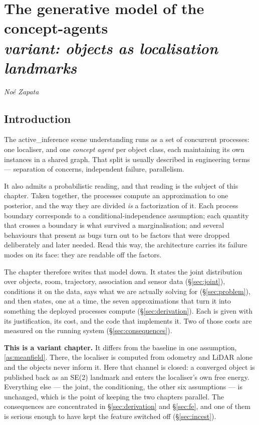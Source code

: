 \documentclass[11pt,a4paper]{report}
\theoremstyle{definition}   %
\begin{document}
\setcounter{chapter}{1}
\chapter{The generative model of the concept-agents\\[4pt]
         \large\normalfont\itshape variant: objects as localisation landmarks}

\begin{flushleft}
\textit{No\'e Zapata}
\end{flushleft}

\vspace{4pt}

\section{Introduction}
\label{sec:intro}



The \textsf{active\_inference} scene understanding runs as a set of concurrent processes: one
localiser, and one \emph{concept agent} per object class, each maintaining its own instances in a
shared graph. That split is usually described in engineering terms --- separation of
concerns, independent failure, parallelism.

It also admits a probabilistic reading, and that reading is the subject of this chapter. Taken
together, the processes compute an approximation to one posterior, and the way they are divided
\emph{is} a factorization of it. Each process boundary corresponds to a conditional-independence
assumption; each quantity that crosses a boundary is what survived a marginalisation; and several
behaviours that present as bugs turn out to be factors that were dropped deliberately and later
needed. Read this way, the architecture carries its failure modes on its face: they are readable
off the factors.

The chapter therefore writes that model down. It states the joint distribution over objects, room,
trajectory, association and sensor data (\S\ref{sec:joint}), conditions it on the data, says what
we are actually solving for (\S\ref{sec:problem}), and then states, one at a time, the seven
approximations that turn it into something the deployed processes compute
(\S\ref{sec:derivation}). Each is given with its justification, its cost, and the code that
implements it. Two of those costs are measured on the running system (\S\ref{sec:consequences}).

\medskip\noindent
\textbf{This is a variant chapter.} It differs from the baseline in one assumption, \ref{as:meanfield}.
There, the localiser is computed from odometry and LiDAR alone and the objects never inform it.
Here that channel is closed: a converged object is published back as an SE(2) landmark and enters
the localiser's own free energy. Everything else --- the joint, the conditioning, the other six
assumptions --- is unchanged, which is the point of keeping the two chapters parallel. The
consequences are concentrated in \S\ref{sec:derivation} and \S\ref{sec:fe}, and one of them is
serious enough to have kept the feature switched off (\S\ref{sec:incest}).
\end{document}
